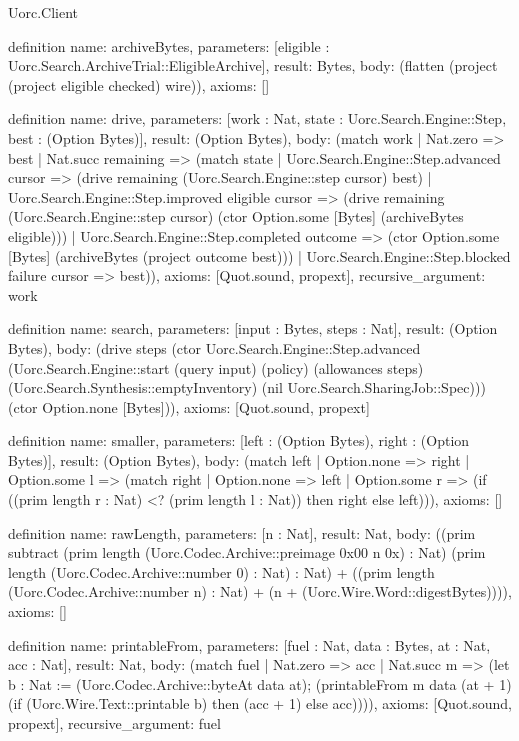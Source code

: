 \begin{lexlean}{Uorc.Client}
\begin{semanticmodule}
definition{
  name: archiveBytes,
  parameters: [eligible : Uorc.Search.ArchiveTrial::EligibleArchive],
  result: Bytes,
  body: (flatten (project (project eligible checked) wire)),
  axioms: []
}

definition{
  name: drive,
  parameters: [work : Nat, state : Uorc.Search.Engine::Step, best : (Option Bytes)],
  result: (Option Bytes),
  body: (match work
    | Nat.zero => best
    | Nat.succ remaining => (match state
      | Uorc.Search.Engine::Step.advanced cursor => (drive remaining (Uorc.Search.Engine::step cursor) best)
      | Uorc.Search.Engine::Step.improved eligible cursor => (drive remaining (Uorc.Search.Engine::step cursor) (ctor Option.some [Bytes] (archiveBytes eligible)))
      | Uorc.Search.Engine::Step.completed outcome => (ctor Option.some [Bytes] (archiveBytes (project outcome best)))
      | Uorc.Search.Engine::Step.blocked failure cursor => best)),
  axioms: [Quot.sound, propext],
  recursive_argument: work
}

definition{
  name: search,
  parameters: [input : Bytes, steps : Nat],
  result: (Option Bytes),
  body: (drive steps (ctor Uorc.Search.Engine::Step.advanced (Uorc.Search.Engine::start (query input) (policy) (allowances steps) (Uorc.Search.Synthesis::emptyInventory) (nil Uorc.Search.SharingJob::Spec))) (ctor Option.none [Bytes])),
  axioms: [Quot.sound, propext]
}

definition{
  name: smaller,
  parameters: [left : (Option Bytes), right : (Option Bytes)],
  result: (Option Bytes),
  body: (match left
    | Option.none => right
    | Option.some l => (match right
      | Option.none => left
      | Option.some r => (if ((prim length r : Nat) <? (prim length l : Nat)) then right else left))),
  axioms: []
}

definition{
  name: rawLength,
  parameters: [n : Nat],
  result: Nat,
  body: ((prim subtract (prim length (Uorc.Codec.Archive::preimage 0x00 n 0x) : Nat) (prim length (Uorc.Codec.Archive::number 0) : Nat) : Nat) + ((prim length (Uorc.Codec.Archive::number n) : Nat) + (n + (Uorc.Wire.Word::digestBytes)))),
  axioms: []
}

definition{
  name: printableFrom,
  parameters: [fuel : Nat, data : Bytes, at : Nat, acc : Nat],
  result: Nat,
  body: (match fuel
    | Nat.zero => acc
    | Nat.succ m => (let b : Nat := (Uorc.Codec.Archive::byteAt data at); (printableFrom m data (at + 1) (if (Uorc.Wire.Text::printable b) then (acc + 1) else acc)))),
  axioms: [Quot.sound, propext],
  recursive_argument: fuel
}


\end{semanticmodule}
\end{lexlean}
